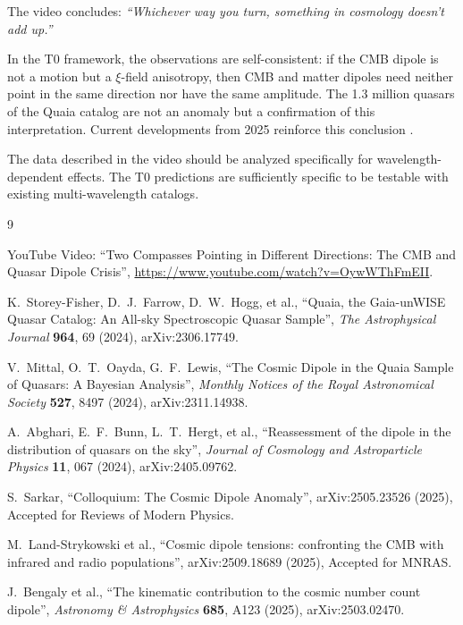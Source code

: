 	The video concludes: \textit{``Whichever way you turn, something in cosmology doesn't add up.''}

	In the T0 framework, the observations are self-consistent: if the CMB dipole is not a motion but a $\xi$-field anisotropy, then CMB and matter dipoles need neither point in the same direction nor have the same amplitude. The 1.3 million quasars of the Quaia catalog are not an anomaly but a confirmation of this interpretation. Current developments from 2025 reinforce this conclusion \cite{sarkar2025}.

	The data described in the video should be analyzed specifically for wavelength-dependent effects. The T0 predictions are sufficiently specific to be testable with existing multi-wavelength catalogs.

	\begin{thebibliography}{9}
		
		YouTube Video: ``Two Compasses Pointing in Different Directions: The CMB and Quasar Dipole Crisis'',
		\url{https://www.youtube.com/watch?v=OywWThFmEII}.
		
		K.~Storey-Fisher, D.~J.~Farrow, D.~W.~Hogg, et al.,
		``Quaia, the Gaia-unWISE Quasar Catalog: An All-sky Spectroscopic Quasar Sample'',
		\emph{The Astrophysical Journal} \textbf{964}, 69 (2024),
		arXiv:2306.17749.
		
		V.~Mittal, O.~T.~Oayda, G.~F.~Lewis,
		``The Cosmic Dipole in the Quaia Sample of Quasars: A Bayesian Analysis'',
		\emph{Monthly Notices of the Royal Astronomical Society} \textbf{527}, 8497 (2024),
		arXiv:2311.14938.
		
		A.~Abghari, E.~F.~Bunn, L.~T.~Hergt, et al.,
		``Reassessment of the dipole in the distribution of quasars on the sky'',
		\emph{Journal of Cosmology and Astroparticle Physics} \textbf{11}, 067 (2024),
		arXiv:2405.09762.
		
		S.~Sarkar,
		``Colloquium: The Cosmic Dipole Anomaly'',
		arXiv:2505.23526 (2025),
		Accepted for Reviews of Modern Physics.
		
		M.~Land-Strykowski et al.,
		``Cosmic dipole tensions: confronting the CMB with infrared and radio populations'',
		arXiv:2509.18689 (2025),
		Accepted for MNRAS.
		
		J.~Bengaly et al.,
		``The kinematic contribution to the cosmic number count dipole'',
		\emph{Astronomy \& Astrophysics} \textbf{685}, A123 (2025),
		arXiv:2503.02470.
		
	\end{thebibliography}
